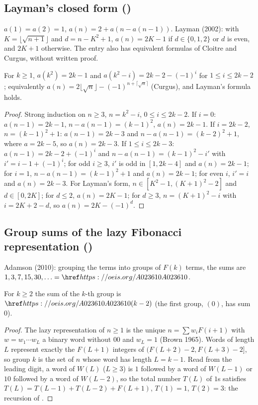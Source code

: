 \subsection{Layman's closed form ()}\label{s:A070864}
$a(1)=a(2)=1$, $a(n)=2+a(n-a(n-1))$. Layman (2002): with $K=\lfloor\sqrt{n+1}\rfloor$ and $d=n-K^2+1$,
$a(n)=2K-1$ if $d\in\{0,1,2\}$ or $d$ is even, and $2K+1$ otherwise. The entry also has equivalent formulas of
Cloitre and Curgus, without written proof.
\begin{theorem} For $k\ge1$, $a(k^2)=2k-1$ and $a(k^2-i)=2k-2-(-1)^i$ for $1\le i\le2k-2$; equivalently
$a(n)=2\lfloor\sqrt n\rfloor-(-1)^{n+\lceil\sqrt n\rceil}$ (Curgus), and Layman's formula holds.\end{theorem}
\begin{proof} Strong induction on $n\ge3$, $n=k^2-i$, $0\le i\le2k-2$. If $i=0$: $a(n-1)=2k-1$, $n-a(n-1)=(k-1)^2$,
$a(n)=2k-1$. If $i=2k-2$, $n=(k-1)^2+1$: $a(n-1)=2k-3$ and $n-a(n-1)=(k-2)^2+1$, where $a=2k-5$, so $a(n)=2k-3$. If
$1\le i\le2k-3$: $a(n-1)=2k-2+(-1)^i$ and $n-a(n-1)=(k-1)^2-i'$ with $i'=i-1+(-1)^i$; for odd $i\ge3$, $i'$ is odd in
$[1,2k-4]$ and $a(n)=2k-1$; for $i=1$, $n-a(n-1)=(k-1)^2+1$ and $a(n)=2k-1$; for even $i$, $i'=i$ and $a(n)=2k-3$.
For Layman's form, $n\in[K^2-1,(K+1)^2-2]$ and $d\in[0,2K]$; for $d\le2$, $a(n)=2K-1$; for $d\ge3$,
$n=(K+1)^2-i$ with $i=2K+2-d$, so $a(n)=2K-(-1)^d$. \end{proof}

\subsection{Group sums of the lazy Fibonacci representation ()}\label{s:A112310}
Adamson (2010): grouping the terms into groups of $F(k)$ terms, the sums are $1,3,7,15,30,\ldots=\oeis{A023610}$.
\begin{theorem} For $k\ge2$ the sum of the $k$-th group is $\oeis{A023610}(k-2)$ (the first group, $(0)$, has sum
$0$).\end{theorem}
\begin{proof} The lazy representation of $n\ge1$ is the unique $n=\sum w_iF(i+1)$ with $w=w_1\cdots w_L$ a binary
word without $00$ and $w_L=1$ (Brown 1965). Words of length $L$ represent exactly the $F(L+1)$ integers of
$(F(L+2)-2,F(L+3)-2]$, so group $k$ is the set of $n$ whose word has length $L=k-1$. Read from the leading digit, a
word of $W(L)$ ($L\ge3$) is $1$ followed by a word of $W(L-1)$ or $10$ followed by a word of $W(L-2)$, so the total
number $T(L)$ of $1$s satisfies $T(L)=T(L-1)+T(L-2)+F(L+1)$, $T(1)=1$, $T(2)=3$: the recursion of .
\end{proof}

